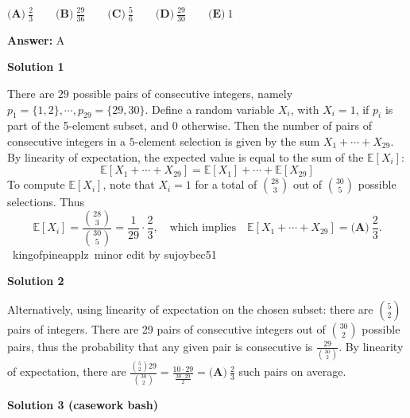 \begin{enumerate}
 $\textbf{(A)}\ \frac{2}{3} \qquad\textbf{(B)}\ \frac{29}{36} \qquad\textbf{(C)}\ \frac{5}{6} \qquad\textbf{(D)}\ \frac{29}{30} \qquad\textbf{(E)}\ 1$

 \textbf{Answer: }A



\textbf{Solution 1}

There are $29$ possible pairs of consecutive integers, namely $p_1=\{1,2\},  \cdots, p_{29}=\{29,30\}$. Define a random variable $X_i$, with $X_i=1$, if $p_i$ is part of the 5-element subset, and $0$ otherwise. Then the number of pairs of consecutive integers in a $5$-element selection is given by the sum $X_1+\cdots + X_{29}$. By linearity of expectation, the expected value is equal to the sum of the $\mathbb{E}[X_i]$:
 \[\mathbb{E}[X_1+\cdots +X_{29}]=\mathbb{E}[X_1]+\cdots + \mathbb{E}[X_{29}]\]To compute $\mathbb{E}[X_i]$, note that $X_i=1$ for a total of $\binom{28}{3}$ out of $\binom{30}{5}$ possible selections. Thus
 \[\mathbb{E}[X_i]=\frac{\binom{28}{3}}{\binom{30}{5}}= \frac 1{29}\cdot \frac 23, \quad \textrm{which implies} \quad \mathbb{E}[X_1+\cdots +X_{29}]= \boxed{\textbf{(A)}\ \frac{2}{3}}.\]~kingofpineapplz~minor edit by sujoybec51

 



\textbf{Solution 2}

Alternatively, using linearity of expectation on the chosen subset: there are ${5 \choose 2}$ pairs of integers. There are 29 pairs of consecutive integers out of ${30 \choose 2}$ possible pairs, thus the probability that any given pair is consecutive is $\frac{29}{{30 \choose 2}}$. By linearity of expectation, there are $\frac{{5 \choose 2}29}{{30 \choose 2}} = \frac{10 \cdot 29}{\frac{30 \cdot 29}{2}} = \boxed{\textbf{(A)}\ \frac{2}{3}}$ such pairs on average.

 



\textbf{Solution 3 (casework bash)}


\end{enumerate}
